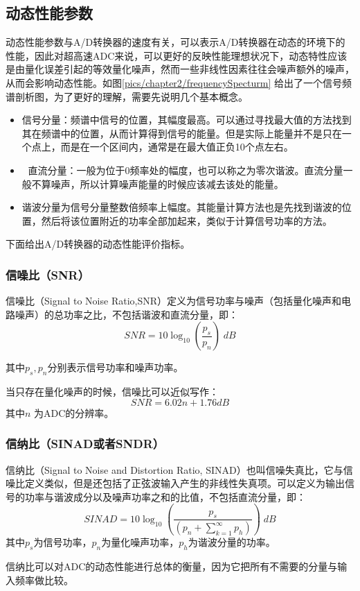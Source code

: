 	\subsection{动态性能参数}
		动态性能参数与A/D转换器的速度有关，可以表示A/D转换器在动态的环境下的性能，因此对超高速ADC来说，可以更好的反映性能理想状况下，动态特性应该是由量化误差引起的等效量化噪声，然而一些非线性因素往往会噪声额外的噪声，从而会影响动态性能。如图\ref{pics/chapter2/frequencySpecturm}
		给出了一个信号频谱剖析图，为了更好的理解，需要先说明几个基本概念。
		\begin{itemize}
			\item 信号分量：频谱中信号的位置，其幅度最高。可以通过寻找最大值的方法找到其在频谱中的位置，从而计算得到信号的能量。但是实际上能量并不是只在一个点上，而是在一个区间内，通常是在最大值正负10个点左右。
			\item 	直流分量：一般为位于0频率处的幅度，也可以称之为零次谐波。直流分量一般不算噪声，所以计算噪声能量的时候应该减去该处的能量。
			\item 
			 谐波分量为信号分量整数倍频率上幅度。其能量计算方法也是先找到谐波的位置，然后将该位置附近的功率全部加起来，类似于计算信号功率的方法。
		\end{itemize}

		下面给出A/D转换器的动态性能评价指标。
		
	
	\subsubsection{信噪比（SNR）}
	
	信噪比（Signal to Noise Ratio,SNR）定义为信号功率与噪声（包括量化噪声和电路噪声）的总功率之比，不包括谐波和直流分量，即：
		\begin{equation}
			SNR = 10{\log _{10}}\left( {\frac{{{p_s}}}{{{p_n}}}} \right)\;dB			
		\end{equation}
		
	其中${p_s},{p_n}$分别表示信号功率和噪声功率。
	\par
	当只存在量化噪声的时候，信噪比可以近似写作：
		\begin{equation}
			SNR = 6.02n + 1.76dB
		\end{equation}
	其中$n$	为ADC的分辨率。
	\subsubsection{信纳比（SINAD或者SNDR）}
		信纳比（Signal to Noise and Distortion Ratio, SINAD）也叫信噪失真比，它与信噪比定义类似，但是还包括了正弦波输入产生的非线性失真项。可以定义为输出信号的功率与谐波成分以及噪声功率之和的比值，不包括直流分量，即：
		\begin{equation}
			SINAD = 10{\log _{10}}\left( {\frac{{{p_s}}}{{\left( {{p_n} + \sum\limits_{k = 1}^\infty  {{p_h}} } \right)}}} \right)\;dB
		\end{equation}
	其中$p_s$为信号功率，$p_n$为量化噪声功率，$p_h$为谐波分量的功率。\par
		信纳比可以对ADC的动态性能进行总体的衡量，因为它把所有不需要的分量与输入频率做比较。
